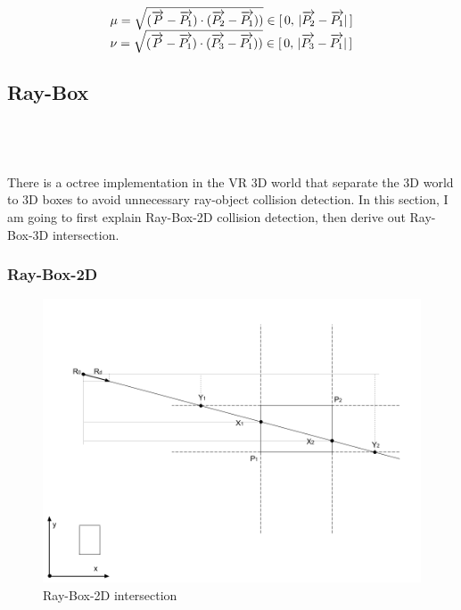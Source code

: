 \[
\begin{array}{lr}
\mu = \sqrt{(\overrightarrow{P} - \overrightarrow{P_1}) \cdot (\overrightarrow{P_2} - \overrightarrow{P_1}))} \in [\,0,\,\lvert \overrightarrow{P_2} - \overrightarrow{P_1} \rvert\,] \\
\nu = \sqrt{(\overrightarrow{P} - \overrightarrow{P_1}) \cdot (\overrightarrow{P_3} - \overrightarrow{P_1}))} \in [\,0,\,\lvert \overrightarrow{P_3} - \overrightarrow{P_1} \rvert\,] 
\end{array}
\]

\subsection{Ray-Box}
\parencite{Williams.ray-box.2005} \\
\parencite{Tavian.ray-box-2d.2011} \\
\parencite{scratchapixel.ray-plane-3d} \\

There is a octree implementation in the VR 3D world that separate the 3D world to 3D boxes to avoid unnecessary ray-object collision detection. In this section, I am going to first explain Ray-Box-2D collision detection, then derive out Ray-Box-3D intersection.

\subsubsection{Ray-Box-2D}

\begin{figure}[H]\label{fig:ray-box-2d}
\centering
\includegraphics[width=\linewidth]{Figures/ray-box-2d-intersection.png}
\decoRule
\caption[ray-box-2d-intersection]{Ray-Box-2D intersection}
\end{figure}

